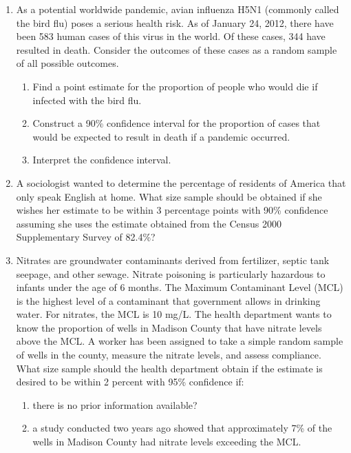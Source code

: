 \documentclass[
]{book}
\providecommand{\tightlist}{%
  \setlength{\itemsep}{0pt}\setlength{\parskip}{0pt}}
\begin{document}
\begin{enumerate}
\def\labelenumi{\arabic{enumi}.}
\item
  As a potential worldwide pandemic, avian influenza H5N1 (commonly called the bird flu) poses a serious health risk. As of January 24, 2012, there have been 583 human cases of this virus in the world. Of these cases, 344 have resulted in death. Consider the outcomes of these cases as a random sample of all possible outcomes.

  \begin{enumerate}
  \def\labelenumii{\alph{enumii}.}
  \tightlist
  \item
    Find a point estimate for the proportion of people who would die if infected with the bird flu.
  \item
    Construct a 90\% confidence interval for the proportion of cases that would be expected to result in death if a pandemic occurred.
  \item
    Interpret the confidence interval.
  \end{enumerate}
\item
  A sociologist wanted to determine the percentage of residents of America that only speak English at home. What size sample should be obtained if she wishes her estimate to be within 3 percentage points with 90\% confidence assuming she uses the estimate obtained from the Census 2000 Supplementary Survey of 82.4\%?
\item
  Nitrates are groundwater contaminants derived from fertilizer, septic tank seepage, and other sewage. Nitrate poisoning is particularly hazardous to infants under the age of 6 months. The Maximum Contaminant Level (MCL) is the highest level of a contaminant that government allows in drinking water. For nitrates, the MCL is 10 mg/L. The health department wants to know the proportion of wells in Madison County that have nitrate levels above the MCL. A worker has been assigned to take a simple random sample of wells in the county, measure the nitrate levels, and assess compliance. What size sample should the health department obtain if the estimate is desired to be within 2 percent with 95\% confidence if:

  \begin{enumerate}
  \def\labelenumii{\alph{enumii}.}
  \tightlist
  \item
    there is no prior information available?
  \item
    a study conducted two years ago showed that approximately 7\% of the wells in Madison County had nitrate levels exceeding the MCL.
  \end{enumerate}
\end{enumerate}
\end{document}
